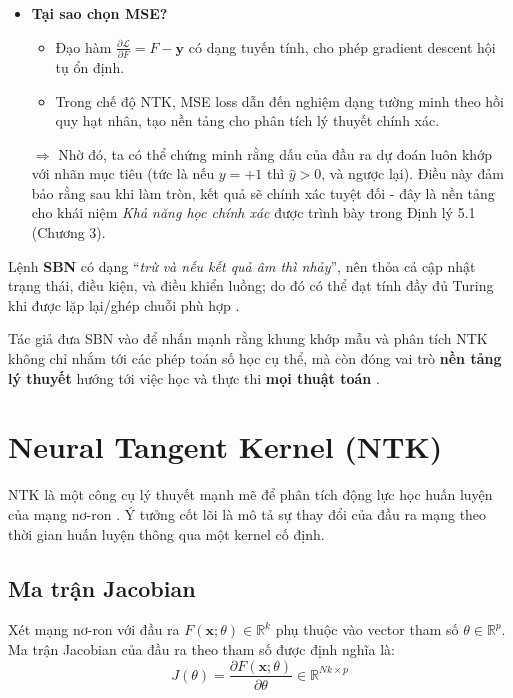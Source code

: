 \begin{enumerate}
    \begin{itemize}
      \item \textbf{Tại sao chọn MSE?}
      \begin{itemize}
          \item Đạo hàm $\frac{\partial \mathcal{L}}{\partial F} = F - \mathbf{y}$ có dạng tuyến tính, cho phép gradient descent hội tụ ổn định.
          \item Trong chế độ NTK, MSE loss dẫn đến nghiệm dạng tường minh theo hồi quy hạt nhân, tạo nền tảng cho phân tích lý thuyết chính xác.
      \end{itemize}
      $\Rightarrow$ Nhờ đó, ta có thể chứng minh rằng dấu của đầu ra dự đoán luôn khớp với nhãn mục tiêu (tức là nếu $y = +1$ thì $\hat{y} > 0$, và ngược lại). Điều này đảm bảo rằng sau khi làm tròn, kết quả sẽ chính xác tuyệt đối - đây là nền tảng cho khái niệm \textit{Khả năng học chính xác} được trình bày trong Định lý 5.1 (Chương 3).
    \end{itemize}
\end{enumerate}

Lệnh \textbf{SBN} có dạng “\textit{trừ và nếu kết quả âm thì nhảy}”, nên thỏa cả cập nhật trạng thái, điều kiện, và điều khiển luồng; do đó có thể đạt tính đầy đủ Turing khi được lặp lại/ghép chuỗi phù hợp \cite{minsky_1967,hopcroft_ullman_1979}.

Tác giả đưa SBN vào để nhấn mạnh rằng khung khớp mẫu và phân tích NTK không chỉ nhắm tới các phép toán số học cụ thể, mà còn đóng vai trò \textbf{nền tảng lý thuyết} hướng tới việc học và thực thi \textbf{mọi thuật toán} \cite{de_luca_2025}.

\section{Neural Tangent Kernel (NTK)}

NTK là một công cụ lý thuyết mạnh mẽ để phân tích động lực học huấn luyện của mạng nơ-ron \cite{jacot_2018}. Ý tưởng cốt lõi là mô tả sự thay đổi của đầu ra mạng theo thời gian huấn luyện thông qua một kernel cố định.

\subsection{Ma trận Jacobian}

Xét mạng nơ-ron với đầu ra $F(\mathbf{x}; \theta) \in \mathbb{R}^k$ phụ thuộc vào vector tham số $\theta \in \mathbb{R}^p$. Ma trận Jacobian của đầu ra theo tham số được định nghĩa là:
\begin{equation}
    J(\theta) = \frac{\partial F(\mathbf{x}; \theta)}{\partial \theta} \in \mathbb{R}^{Nk \times p}
\end{equation}

